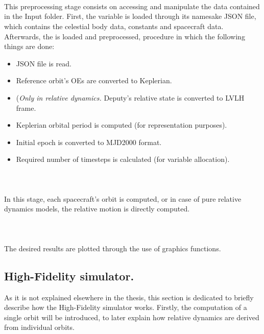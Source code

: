 	\paragraph{  \\}
	\indent This preprocessing stage consists on accessing and manipulate the data contained in the Input folder. First, the  variable is loaded through its namesake JSON file, which contains the celestial body data, constants and spacecraft data. Afterwards, the  is loaded and preprocessed, procedure in which the following things are done:
	\begin{itemize}
	\item[\GMVred{1.}] JSON file is read.
	\item[\GMVred{2.}] Reference orbit's OEs are converted to Keplerian.
	\item[\GMVred{3.}](\textsl{Only in relative dynamics.} Deputy's relative state is converted to LVLH frame.
	\item[\GMVred{4.}] Keplerian orbital period is computed (for representation purposes).
	\item[\GMVred{5.}] Initial epoch is converted to MJD2000 format.
	\item[\GMVred{6.}] Required number of timesteps is calculated (for variable allocation).
	\end{itemize}
	\paragraph{  \\}
	\indent In this stage, each spacecraft's orbit is computed, or in case of pure relative dynamics models, the relative motion is directly computed.
	\paragraph{  \\}
	\indent The desired results are plotted through the use of graphics functions.
	\subsection{High-Fidelity simulator.}\label{sec:HiFi_sim}
	\indent As it is not explained elsewhere in the thesis, this section is dedicated to briefly describe how the High-Fidelity simulator works. Firstly, the computation of a single orbit will be introduced, to later explain how relative dynamics are derived from individual orbits.
